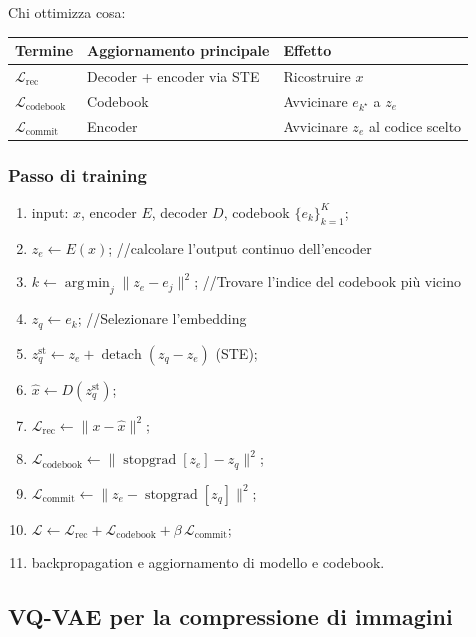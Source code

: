 \documentclass[11pt,a4paper]{article}
\newcommand{\Loss}{\mathcal{L}}
\DeclareMathOperator*{\argmin}{arg\,min}
\begin{document}
Chi ottimizza cosa:
\begin{center}
\renewcommand{\arraystretch}{1.3}
\begin{tabular}{lll}
\hline
\textbf{Termine} & \textbf{Aggiornamento principale} & \textbf{Effetto} \\
\hline
$\mathcal{L}_{\mathrm{rec}}$ & Decoder + encoder via STE & Ricostruire $x$ \\
$\mathcal{L}_{\mathrm{codebook}}$ & Codebook & Avvicinare $e_{k^\star}$ a $z_e$ \\
$\mathcal{L}_{\mathrm{commit}}$ & Encoder & Avvicinare $z_e$ al codice scelto \\
\hline
\end{tabular}
\end{center}

\newpage

\subsubsection{Passo di training}
\begin{enumerate}
  \item input: $x$, encoder $E$, decoder $D$, codebook $\{e_k\}_{k=1}^{K}$;
  \item $z_e \leftarrow E(x)$;  //calcolare l'output continuo dell'encoder
  \item $k \leftarrow \argmin_j \|z_e - e_j\|^2$; //Trovare l'indice del codebook più vicino
  \item $z_q \leftarrow e_k$; //Selezionare l'embedding
  \item $z_q^{\mathrm{st}} \leftarrow z_e + \operatorname{detach}(z_q - z_e)$ (STE);
  \item $\hat{x} \leftarrow D(z_q^{\mathrm{st}})$;
  \item $\Loss_{\mathrm{rec}} \leftarrow \|x - \hat{x}\|^2$;
  \item $\Loss_{\mathrm{codebook}} \leftarrow \|\operatorname{stopgrad}[z_e] - z_q\|^2$;
  \item $\Loss_{\mathrm{commit}} \leftarrow \|z_e - \operatorname{stopgrad}[z_q]\|^2$;
  \item $\Loss \leftarrow \Loss_{\mathrm{rec}} + \Loss_{\mathrm{codebook}} + \beta\, \Loss_{\mathrm{commit}}$;
  \item backpropagation e aggiornamento di modello e codebook.
\end{enumerate}

\subsection{VQ-VAE per la compressione di immagini}
\end{document}
